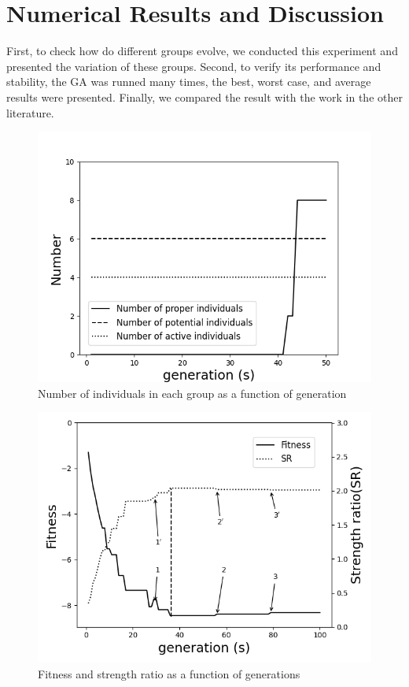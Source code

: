 \section{Numerical Results and Discussion}
First, to check how do different groups evolve, we conducted this experiment
and presented the variation of these groups. Second, to verify its performance
and stability, the GA was runned many times, the best, worst case, and average
results were presented. Finally, we compared the result with the work in the
other literature.

\begin{figure}[!htb]
	\centering
	\includegraphics[width=\linewidth]{fig/group_number.png}
	\caption{Number of individuals in each group as a function of generation}
	\label{fig:group}
\end{figure}

\begin{figure}[!htb]
	\centering
	\includegraphics[width=\linewidth]{fig/fitness_strength_ratio.png}
	\caption{Fitness and strength ratio as a function of generations}
	\label{fig:sr}
\end{figure}



